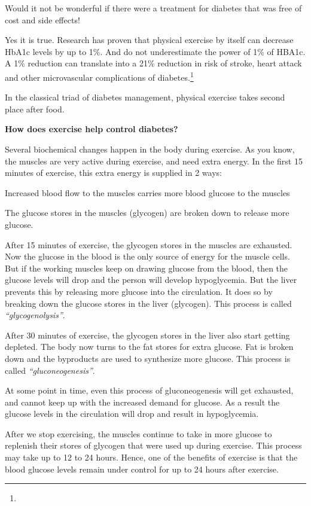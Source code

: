 Would it not be wonderful if there were a treatment for diabetes that was free of cost and side effects!

Yes it is true. Research has proven that physical exercise by itself can decrease HbA1c levels by up to 1\%. And do not underestimate the power of 1\% of HBA1c. A 1\% reduction can translate into a 21\% reduction in risk of stroke, heart attack and other microvascular complications of diabetes.\footnote{}

In the classical triad of diabetes management, physical exercise takes second place after food.


\textbf{How does exercise help control diabetes?}

Several biochemical changes happen in the body during exercise. As you know, the muscles are very active during exercise, and need extra energy. In the first 15 minutes of exercise, this extra energy is supplied in 2 ways:

\item Increased blood flow to the muscles carries more blood glucose to the muscles

 \item The glucose stores in the muscles (glycogen) are broken down to release more glucose.

After 15 minutes of exercise, the glycogen stores in the muscles are exhausted. Now the glucose in the blood is the only source of energy for the muscle cells. But if the working muscles keep on drawing glucose from the blood, then the glucose levels will drop and the person will develop hypoglycemia. But the liver prevents this by releasing more glucose into the circulation. It does so by breaking down the glucose stores in the liver (glycogen). This process is called \textit{“glycogenolysis”}.

After 30 minutes of exercise, the glycogen stores in the liver also start getting depleted. The body now turns to the fat stores for extra glucose. Fat is broken down and the byproducts are used to synthesize more glucose. This process is called \textit{“gluconeogenesis”}.

At some point in time, even this process of gluconeogenesis will get exhausted, and cannot keep up with the increased demand for glucose. As a result the glucose levels in the circulation will drop and result in hypoglycemia.

After we stop exercising, the muscles continue to take in more glucose to replenish their stores of glycogen that were used up during exercise. This process may take up to 12 to 24 hours. Hence, one of the benefits of exercise is that the blood glucose levels remain under control for up to 24 hours after exercise.

